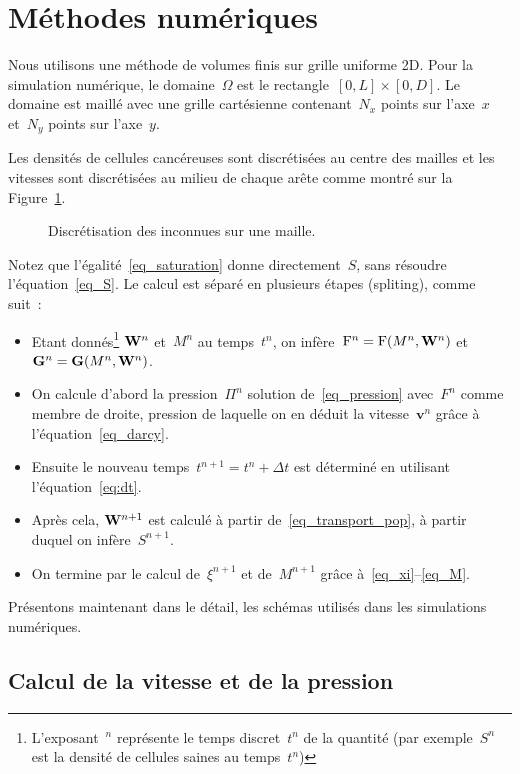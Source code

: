 \documentclass[11pt]{amsart}
\numberwithin{equation}{section}
\newcommand{\W}{{\bf W}}
\newcommand{\Frm}{{\rm F}}
\newcommand{\GG}{{\bf G}}
\newcommand{\vit}{\mathbf{v}}
\begin{document}
\section{Méthodes numériques}\label{sec:NumMet}

Nous utilisons une méthode de volumes finis sur grille uniforme 2D. Pour la simulation numérique, le domaine~$\Omega$ est le 
rectangle~$[0,L]\times[0,D]$. Le domaine est maillé avec une grille cartésienne contenant~$N_x$ points sur l'axe~$x$ et~$N_y$ points sur l'axe~$y$.

Les densités de cellules cancéreuses sont discrétisées au centre des mailles et les vitesses sont discrétisées au milieu de chaque arête comme montré sur la Figure~\ref{fig:place_inconnues}.

\begin{figure}[h]
\centering

\caption{Discrétisation des inconnues sur une maille.\label{fig:place_inconnues}}
\end{figure}


Notez que l'égalité~\eqref{eq_saturation} donne directement~$S$, sans résoudre l'équation~\eqref{eq_S}. Le calcul est séparé en plusieurs étapes  (spliting), comme suit~:
\begin{itemize}
\item Etant donnés\footnote{L'exposant~$^n$ représente le temps discret~$t^n$ de la quantité 
(par exemple~$S^n$ est la densité de cellules saines au temps~$t^n$)}
$\W^n$ et~$M^n$ au temps~$t^n$, on infère~$\Frm^n=\Frm(M^n,\W^n)$ et
$\GG^n=\GG(M^n,\W^n)$.
\item On calcule d'abord la pression~$\Pi^n$ solution de~\eqref{eq_pression} avec~$F^n$ comme membre de droite, pression de laquelle on en déduit la vitesse~$\vit^n$ grâce à l'équation~\eqref{eq_darcy}.
\item Ensuite le nouveau temps~$t^{n+1}=t^n+\Delta t$ est déterminé en utilisant l'équation~\eqref{eq:dt}.
\item Après cela, $\W^{n+1}$ est calculé à partir de~\eqref{eq_transport_pop}, à partir duquel on infère~$S^{n+1}$.
\item On termine par le calcul de~$\xi^{n+1}$ et de~$M^{n+1}$ grâce à~\eqref{eq_xi}--\eqref{eq_M}.
\end{itemize}
Présentons maintenant dans le détail, les schémas utilisés dans les simulations numériques.

\subsection{Calcul de la vitesse et de la pression} 
\end{document}
